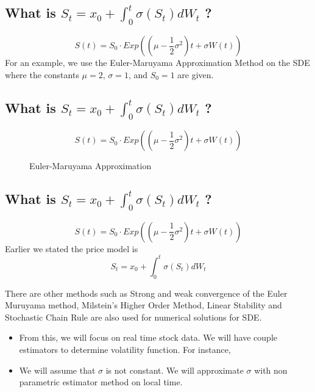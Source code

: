 \subsection{ What is $S_t = x_0 + \int_0^t \sigma\left(S_t\right)dW_t$ ?}
\begin{equation}
S(t) = S_0 \cdot Exp \left( \left( \mu - \frac{1}{2} \sigma^2 \right)t + \sigma W(t) \right) 
\end{equation} 
For an example, we use the Euler-Maruyama Approximation Method on the SDE where the constants $\mu = 2$, $\sigma = 1$,
and $S_0 = 1$ are given.


\subsection{ What is $S_t = x_0 + \int_0^t \sigma\left(S_t\right)dW_t$ ?}
\begin{equation}
S(t) = S_0 \cdot Exp \left( \left( \mu - \frac{1}{2} \sigma^2 \right)t + \sigma W(t) \right) 
\end{equation} 
\begin{figure}[h!]
  \caption{Euler-Maruyama Approximation}
  \centering

\end{figure}

\subsection{What is $S_t = x_0 + \int_0^t \sigma\left(S_t\right)dW_t$ ?}
\begin{equation}
S(t) = S_0 \cdot Exp \left( \left( \mu - \frac{1}{2} \sigma^2 \right)t + \sigma W(t) \right) 
\end{equation} 
Earlier we stated the price model is
\begin{equation}
S_t = x_0 + \int_0^t \sigma\left(S_t\right)dW_t
\end{equation}

There are other methods such as Strong and weak convergence of the Euler Muruyama method, Milstein's Higher Order Method, Linear Stability and Stochastic Chain Rule are also used for numerical solutions for SDE.
\begin{itemize}
\item From this, we will focus on real time stock data. We will have couple estimators to determine volatility function. For instance, 
\item We will assume that $\sigma$ is not constant.  We will approximate $\sigma$ with non parametric estimator method on local time.
\end{itemize} 